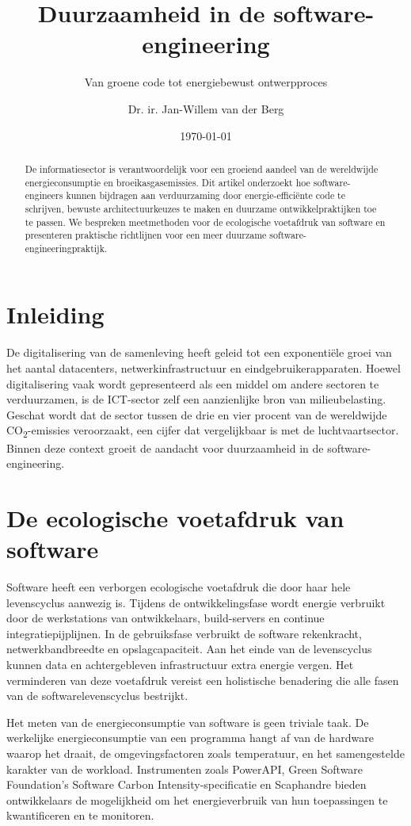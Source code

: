 \documentclass[
    language=dutch,
    doctype=article,
]{../../omnilatex}
\title{Duurzaamheid in de software-engineering}
\subtitle{Van groene code tot energiebewust ontwerpproces}
\author{Dr. ir. Jan-Willem van der Berg}
\date{\today}
\begin{document}
\maketitle

\begin{abstract}
De informatiesector is verantwoordelijk voor een groeiend aandeel van de wereldwijde energieconsumptie en broeikasgasemissies. Dit artikel onderzoekt hoe software-engineers kunnen bijdragen aan verduurzaming door energie-efficiënte code te schrijven, bewuste architectuurkeuzes te maken en duurzame ontwikkelpraktijken toe te passen. We bespreken meetmethoden voor de ecologische voetafdruk van software en presenteren praktische richtlijnen voor een meer duurzame software-engineeringpraktijk.
\end{abstract}

\section{Inleiding}
De digitalisering van de samenleving heeft geleid tot een exponentiële groei van het aantal datacenters, netwerkinfrastructuur en eindgebruikerapparaten. Hoewel digitalisering vaak wordt gepresenteerd als een middel om andere sectoren te verduurzamen, is de ICT-sector zelf een aanzienlijke bron van milieubelasting. Geschat wordt dat de sector tussen de drie en vier procent van de wereldwijde CO\textsubscript{2}-emissies veroorzaakt, een cijfer dat vergelijkbaar is met de luchtvaartsector. Binnen deze context groeit de aandacht voor duurzaamheid in de software-engineering.

\section{De ecologische voetafdruk van software}
Software heeft een verborgen ecologische voetafdruk die door haar hele levenscyclus aanwezig is. Tijdens de ontwikkelingsfase wordt energie verbruikt door de werkstations van ontwikkelaars, build-servers en continue integratiepijplijnen. In de gebruiksfase verbruikt de software rekenkracht, netwerkbandbreedte en opslagcapaciteit. Aan het einde van de levenscyclus kunnen data en achtergebleven infrastructuur extra energie vergen. Het verminderen van deze voetafdruk vereist een holistische benadering die alle fasen van de softwarelevenscyclus bestrijkt.

Het meten van de energieconsumptie van software is geen triviale taak. De werkelijke energieconsumptie van een programma hangt af van de hardware waarop het draait, de omgevingsfactoren zoals temperatuur, en het samengestelde karakter van de workload. Instrumenten zoals PowerAPI, Green Software Foundation's Software Carbon Intensity-specificatie en Scaphandre bieden ontwikkelaars de mogelijkheid om het energieverbruik van hun toepassingen te kwantificeren en te monitoren.
\end{document}
